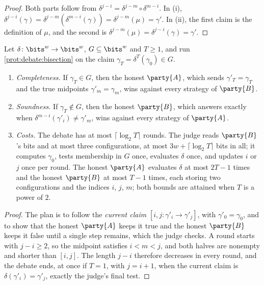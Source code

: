 \begin{refsection}
\begin{proof}
Both parts follow from $\delta^{j-i}=\delta^{j-m}\circ\delta^{m-i}$. In (i), $\delta^{j-i}(\gamma)=\delta^{j-m}(\delta^{m-i}(\gamma))=\delta^{j-m}(\mu)=\gamma'$. In (ii), the first claim is the definition of $\mu$, and the second is $\delta^{j-m}(\mu)=\delta^{j-i}(\gamma)=\gamma'$.
\end{proof}

\begin{theorem}\label{thm:debate:bisection}
Let $\delta\colon\bits^w\to\bits^w$, $G\subseteq\bits^w$ and $T\ge1$, and run \cref{prot:debate:bisection} on the claim $\gamma_T=\delta^T(\gamma_0)\in G$.
\begin{enumerate}
\item \emph{Completeness.} If $\gamma_T\in G$, then the honest $\party{A}$, which sends $\gamma'_T=\gamma_T$ and the true midpoints $\gamma'_m=\gamma_m$, wins against every strategy of $\party{B}$.
\item \emph{Soundness.} If $\gamma_T\notin G$, then the honest $\party{B}$, which answers \debateL{} exactly when $\delta^{m-i}(\gamma'_i)\ne\gamma'_m$, wins against every strategy of $\party{A}$.
\item \emph{Costs.} The debate has at most $\lceil\log_2T\rceil$ rounds. The judge reads $\party{B}$'s bits and at most three configurations, at most $3w+\lceil\log_2T\rceil$ bits in all; it computes $\gamma_0$, tests membership in $G$ once, evaluates $\delta$ once, and updates $i$ or $j$ once per round. The honest $\party{A}$ evaluates $\delta$ at most $2T-1$ times and the honest $\party{B}$ at most $T-1$ times, each storing two configurations and the indices $i$, $j$, $m$; both bounds are attained when $T$ is a power of $2$.
\end{enumerate}
\end{theorem}

\begin{proof}
The plan is to follow the \emph{current claim} $[i,j:\gamma'_i\to\gamma'_j]$, with $\gamma'_0=\gamma_0$, and to show that the honest $\party{A}$ keeps it true and the honest $\party{B}$ keeps it false until a single step remains, which the judge checks. A round starts with $j-i\ge2$, so the midpoint satisfies $i<m<j$, and both halves are nonempty and shorter than $[i,j]$. The length $j-i$ therefore decreases in every round, and the debate ends, at once if $T=1$, with $j=i+1$, when the current claim is $\delta(\gamma'_i)=\gamma'_j$, exactly the judge's final test.


\end{proof}
\end{refsection}
